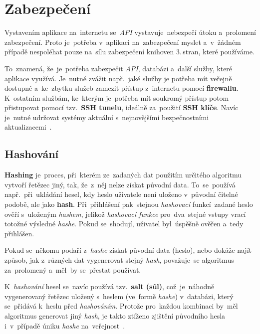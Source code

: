 \documentclass[11pt,a4paper]{report}
\begin{document}
        \section{Zabezpečení}
            Vystavením aplikace na~internetu se~\emph{API} vystavuje~nebezpečí útoku a~prolomení zabezpečení. Proto je~potřeba v~aplikaci na~zabezpečení myslet a~v~žádném případě nespoléhat pouze na~sílu zabezpečení knihoven 3.\,stran, které používáme.
            
            To~znamená, že~je~potřeba zabezpečit \emph{API}, databázi a~další služby, které aplikace využívá. Je~nutné zvážit např.~jaké služby je potřeba mít veřejně dostupné a~ke~zbytku služeb zamezit přístup z~internetu pomocí \textbf{firewallu}. K~ostatním službám, ke~kterým je~potřeba mít soukromý přístup potom přistupovat pomocí tzv.~\textbf{SSH tunelu}, ideálně za~použití \textbf{SSH klíče}. Navíc je~nutné udržovat systémy aktuální s~nejnovějšími bezpečnostními aktualizacemi~\cite{graham2021ethical, Dorman:webmappingajax}.
            
            \subsection{Hashování}
                \textbf{Hashing} je~proces, při~kterém ze~zadaných dat použitím určitého algoritmu vytvoří řetězec jiný, tak, že~z~něj nelze získat původní data. To~se~používá např.~při~ukládání hesel, kdy heslo uživatele není uloženo v~původní čitelné podobě, ale jako \textbf{hash}. Při~přihlášení pak~stejnou \emph{hashovací} funkcí~zadané heslo ověří s~uloženým \emph{hashem}, jelikož \emph{hashovací funkce} pro~dva~stejné vstupy vrací totožné výsledné \emph{hashe}. Pokud se~shodují, uživatel byl~úspěšně ověřen a~tedy přihlášen.
                
                Pokud se~někomu podaří z~\emph{hashe} získat původní data (heslo), nebo dokáže najít způsob, jak z~různých dat vygenerovat stejný \emph{hash}, považuje~se algoritmus za~prolomený a~měl~by se~přestat používat.
                
                K~\emph{hashování} hesel se~navíc používá tzv.~\textbf{salt (sůl)}, což~je~náhodně vygenerovaný řetězec uložený s~heslem (ve~formě \emph{hashe}) v~databázi, který se~přidává k~heslu před \emph{hashováním}. Protože pro~každou kombinaci by~měl algoritmus generovat jiný \emph{hash}, je takto ztíženo zjištění původního hesla i~v~případě úniku \emph{hashe} na~veřejnost~\cite{graham2021ethical}.
        
\end{document}
